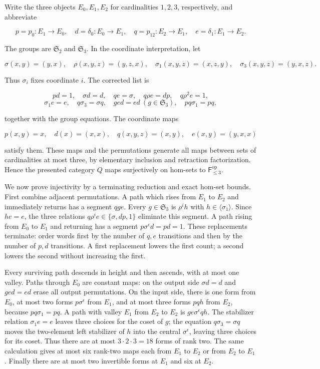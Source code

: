 Write the three objects \(E_0,E_1,E_2\) for cardinalities \(1,2,3\),
respectively, and abbreviate

\[p=p_0:E_1\to E_0,\quad d=\delta_0:E_0\to E_1,
\quad q=p_{12}:E_2\to E_1,\quad e=\delta_1:E_1\to E_2.\]

The groups are \(\mathfrak S_2\) and \(\mathfrak S_3\). In the
coordinate interpretation, let

\[\sigma(x,y)=(y,x),\quad \rho(x,y,z)=(y,z,x),
\quad\sigma_1(x,y,z)=(x,z,y),\quad\sigma_3(x,y,z)=(y,x,z).\]

Thus \(\sigma_i\) fixes coordinate \(i\). The corrected list is

\[pd=1,\quad \sigma d=d,\quad qe=\sigma,\quad q\rho e=dp,
\quad q\rho^2e=1,\]
\[\sigma_1e=e,\quad q\sigma_3=\sigma q,\quad ged=ed\ (g\in\mathfrak S_3),
\quad pq\sigma_1=pq,\]

together with the group equations. The coordinate maps

\[p(x,y)=x,\quad d(x)=(x,x),\quad q(x,y,z)=(x,y),\quad e(x,y)=(y,x,x)\]

satisfy them. These maps and the permutations generate all maps between
sets of cardinalities at most three, by elementary inclusion and
retraction factorization. Hence the presented category \(Q\) maps
surjectively on hom-sets to \(\mathsf F_{\le3}^{\mathrm{op}}\).

We now prove injectivity by a terminating reduction and exact hom-set
bounds. First combine adjacent permutations. A path which rises from
\(E_1\) to \(E_2\) and immediately returns has a segment \(qge\). Every
\(g\in\mathfrak S_3\) is \(\rho^i h\) with
\(h\in\langle\sigma_1\rangle\). Since \(he=e\), the three relations
\(q\rho^ie\in\{\sigma,dp,1\}\) eliminate this segment. A path rising
from \(E_0\) to \(E_1\) and returning has a segment
\(p\sigma^\epsilon d=p d=1\). These replacements terminate: order words
first by the number of \(q,e\) transitions and then by the number of
\(p,d\) transitions. A first replacement lowers the first count; a
second lowers the second without increasing the first.

Every surviving path descends in height and then ascends, with at most
one valley. Paths through \(E_0\) are constant maps: on the output side
\(\sigma d=d\) and \(ged=ed\) erase all output permutations. On the
input side, there is one form from \(E_0\), at most two forms
\(p\sigma^\epsilon\) from \(E_1\), and at most three forms \(pqh\) from
\(E_2\), because \(pq\sigma_1=pq\). A path with valley \(E_1\) from
\(E_2\) to \(E_2\) is \(ge\sigma^\epsilon qh\). The stabilizer relation
\(\sigma_1e=e\) leaves three choices for the coset of \(g\); the
equation \(q\sigma_3=\sigma q\) moves the two-element left stabilizer of
\(h\) into the central \(\sigma^\epsilon\), leaving three choices for
its coset. Thus there are at most \(3\cdot2\cdot3=18\) forms of rank
two. The same calculation gives at most six rank-two maps each from
\(E_1\) to \(E_2\) or from \(E_2\) to \(E_1\). Finally there are at most
two invertible forms at \(E_1\) and six at \(E_2\).

